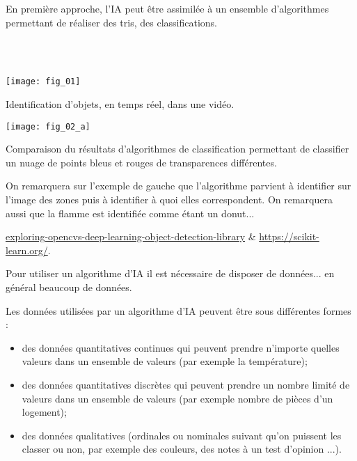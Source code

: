 En première approche, l'IA peut être assimilée à un ensemble d'algorithmes permettant de réaliser des tris, des classifications.
\begin{exemple}~\\
\\
\vspace{-1cm}

\begin{multicols}{2}
\begin{center}
\texttt{[image: fig\_01]}
\end{center}
Identification d'objets, en temps réel, dans une vidéo.

\begin{center}
\texttt{[image: fig\_02\_a]}
\end{center}


Comparaison du résultats d'algorithmes de classification permettant de classifier un nuage de points bleus et rouges de transparences différentes.
\end{multicols}

On remarquera sur l'exemple de gauche que l'algorithme parvient à identifier sur l'image des zones puis à identifier à quoi elles correspondent. On remarquera aussi que la flamme est identifiée comme étant un donut...


\begin{flushright}
\footnotesize
\url{exploring-opencvs-deep-learning-object-detection-library} \&  \url{https://scikit-learn.org/}.
\normalsize

\end{flushright}
\end{exemple}



Pour utiliser un algorithme d'IA il est nécessaire de disposer de données... en général beaucoup de données. 
\begin{defi}[Données]
Les données utilisées par un algorithme d'IA peuvent être sous différentes formes : 
\begin{itemize}
\item des données quantitatives continues qui peuvent prendre n'importe quelles valeurs dans un ensemble de valeurs (par exemple la température);
\item des données quantitatives discrètes qui peuvent prendre un nombre limité de valeurs dans un ensemble de valeurs (par exemple nombre de pièces d'un logement);
\item des données qualitatives (ordinales ou nominales suivant qu'on puissent les classer ou non, par exemple des couleurs, des notes à un test d'opinion ...).
\end{itemize}

\end{defi}

